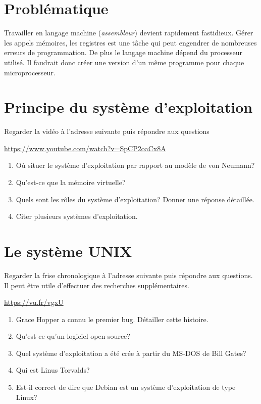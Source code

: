\documentclass[a4paper,11pt]{article}
\begin{document}
\begin{Form}
\section{Problématique}
Travailler en langage machine (\emph{assembleur}) devient rapidement fastidieux. Gérer les appels mémoires, les registres est une tâche qui peut engendrer de nombreuses erreurs de programmation. De plus le langage machine dépend du processeur utilisé. Il faudrait donc créer une version d'un même programme pour chaque microprocesseur.
\begin{center}
\end{center}
\section{Principe du système d'exploitation}
\begin{activite}
Regarder la vidéo à l'adresse suivante puis répondre aux questions
\begin{center}
\url{https://www.youtube.com/watch?v=SpCP2oaCx8A}
\end{center}
\begin{enumerate}
\item Où situer le système d'exploitation par rapport au modèle de von Neumann?
\item Qu'est-ce que la mémoire virtuelle?
\item Quels sont les rôles du système d'exploitation? Donner une réponse détaillée.
\item Citer plusieurs systèmes d'exploitation.
\end{enumerate}
\end{activite}
\section{Le système UNIX}
\begin{activite}
Regarder la frise chronologique à l'adresse suivante puis répondre aux questions. Il peut être utile d'effectuer des recherches supplémentaires.
\begin{center}
\href{https://cdn.knightlab.com/libs/timeline3/latest/embed/index.html?source=1aroW_4ry_iAT3EiVA8aiR6DhcdzIwMU2uymPzkb7UAs&font=Default&lang=fr&initial_zoom=2&height=650}
{https://vu.fr/vgxU}\end{center}
\begin{enumerate}
\item Grace Hopper a connu le premier bug. Détailler cette histoire.
\item Qu'est-ce-qu'un logiciel open-source?
\item Quel système d'exploitation a été crée à partir du MS-DOS de Bill Gates?
\item Qui est Linus Torvalds?
\item Est-il correct de dire que Debian est un système d'exploitation de type Linux?
\end{enumerate}
\end{activite}
\end{Form}
\end{document}
